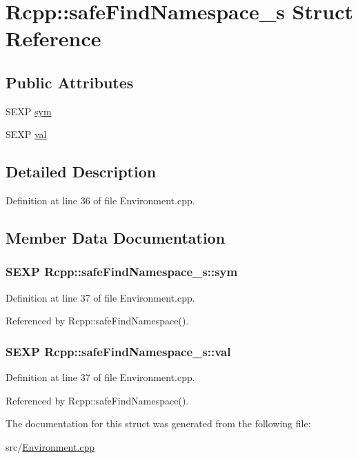 \hypertarget{structRcpp_1_1safeFindNamespace__s}{
\section{Rcpp::safeFindNamespace\_\-s Struct Reference}
\label{structRcpp_1_1safeFindNamespace__s}
}
\subsection*{Public Attributes}
\begin{DoxyCompactItemize}
\item 
SEXP \hyperlink{structRcpp_1_1safeFindNamespace__s_ab564a6aa41b9b1daf9dc184b54c1a70e}{sym}
\item 
SEXP \hyperlink{structRcpp_1_1safeFindNamespace__s_aec506caf7d1cd9d39e3d1f050e03919d}{val}
\end{DoxyCompactItemize}


\subsection{Detailed Description}


Definition at line 36 of file Environment.cpp.

\subsection{Member Data Documentation}
\hypertarget{structRcpp_1_1safeFindNamespace__s_ab564a6aa41b9b1daf9dc184b54c1a70e}{
\subsubsection[{sym}]{\setlength{\rightskip}{0pt plus 5cm}SEXP {\bf Rcpp::safeFindNamespace\_\-s::sym}}}
\label{structRcpp_1_1safeFindNamespace__s_ab564a6aa41b9b1daf9dc184b54c1a70e}


Definition at line 37 of file Environment.cpp.

Referenced by Rcpp::safeFindNamespace().\hypertarget{structRcpp_1_1safeFindNamespace__s_aec506caf7d1cd9d39e3d1f050e03919d}{
\subsubsection[{val}]{\setlength{\rightskip}{0pt plus 5cm}SEXP {\bf Rcpp::safeFindNamespace\_\-s::val}}}
\label{structRcpp_1_1safeFindNamespace__s_aec506caf7d1cd9d39e3d1f050e03919d}


Definition at line 37 of file Environment.cpp.

Referenced by Rcpp::safeFindNamespace().

The documentation for this struct was generated from the following file:\begin{DoxyCompactItemize}
\item 
src/\hyperlink{Environment_8cpp}{Environment.cpp}\end{DoxyCompactItemize}
